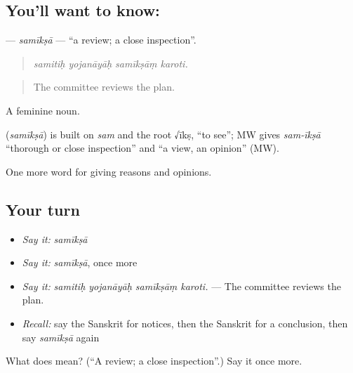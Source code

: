 \subsection*{You'll want to know: }
\textbf{} — \emph{samīkṣā} — \textquotedblleft{}a review; a close inspection\textquotedblright{}.

\begin{quote}
   
\end{quote}

\begin{quote}
\emph{samitiḥ yojanāyāḥ samīkṣāṃ karoti.}
\end{quote}

\begin{quote}
The committee reviews the plan.
\end{quote}

A feminine noun.

\begin{cousinweb}
\textbf{} (\emph{samīkṣā}) is built on \emph{sam} and the root √īkṣ, \textquotedblleft{}to see\textquotedblright{}; MW gives \emph{sam-īkṣā} \textquotedblleft{}thorough or close inspection\textquotedblright{} and \textquotedblleft{}a view, an opinion\textquotedblright{} (MW).
\end{cousinweb}

\begin{grammarlens}[title={What you've built}]
One more word for giving reasons and opinions.
\end{grammarlens}

\subsection*{Your turn}
\begin{itemize}
\raggedright
  \item \emph{Say it:} \emph{samīkṣā}
  \item \emph{Say it:} \emph{samīkṣā}, once more
  \item \emph{Say it:} \emph{samitiḥ yojanāyāḥ samīkṣāṃ karoti.} — The committee reviews the plan.
  \item \emph{Recall:} say the Sanskrit for notices, then the Sanskrit for a conclusion, then say \emph{samīkṣā} again
\end{itemize}

\begin{tcolorbox}[breakable,colback=teal!4,colframe=teal!35!black,title={Before you move on}]
What does  mean? (\textquotedblleft{}A review; a close inspection\textquotedblright{}.) Say it once more.
\end{tcolorbox}
